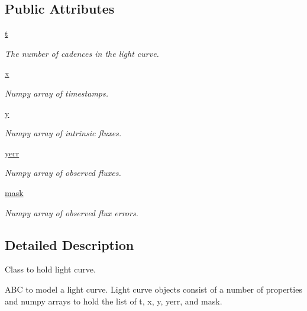 \subsection*{Public Attributes}
\begin{DoxyCompactItemize}
\item 
\hyperlink{classpython_1_1libcarma_1_1libcarma_1_1lc_ae93b27478fd4ad5c8ee58d8764fe2211}{t}
\begin{DoxyCompactList}\small\item\em The number of cadences in the light curve. \end{DoxyCompactList}\item 
\hyperlink{classpython_1_1libcarma_1_1libcarma_1_1lc_a94316ed54be0afdbd7e67f2d56ad43dc}{x}
\begin{DoxyCompactList}\small\item\em Numpy array of timestamps. \end{DoxyCompactList}\item 
\hyperlink{classpython_1_1libcarma_1_1libcarma_1_1lc_ab4f0a7ce4a5aea2d190f61acfeb072a3}{y}
\begin{DoxyCompactList}\small\item\em Numpy array of intrinsic fluxes. \end{DoxyCompactList}\item 
\hyperlink{classpython_1_1libcarma_1_1libcarma_1_1lc_a8b0494641d0d12c1351dae5bdb445138}{yerr}
\begin{DoxyCompactList}\small\item\em Numpy array of observed fluxes. \end{DoxyCompactList}\item 
\hyperlink{classpython_1_1libcarma_1_1libcarma_1_1lc_a8cfbe9e3641e9aed8c7ff25fee4beaa8}{mask}
\begin{DoxyCompactList}\small\item\em Numpy array of observed flux errors. \end{DoxyCompactList}\end{DoxyCompactItemize}


\subsection{Detailed Description}
Class to hold light curve. 

\label{classpython_1_1libcarma_1_1libcarma_1_1lc_lc_}%
\hypertarget{classpython_1_1libcarma_1_1libcarma_1_1lc_lc_}{}%
 A\-B\-C to model a light curve. Light curve objects consist of a number of properties and numpy arrays to hold the list of t, x, y, yerr, and mask. 

